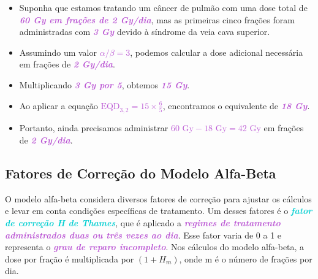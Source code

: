 \documentclass[11pt,a4paper]{article}
\begin{document}
	\begin{tcolorbox}[width=\textwidth, colback={white}, colbacktitle={DarkTurquoise!50!white}, title={$\bigstar$ \LobsterTwo{Exemplo: Cálculo do EQD\textsubscript{2}} $\bigstar$}, coltitle={CarnationPink}, colframe={DarkTurquoise}, fonttitle=\rmfamily\bfseries\Large, breakable]

		\begin{itemize}[label=\textcolor{CarnationPink}{$\blacktriangleright$}]
			\item Suponha que estamos tratando um câncer de pulmão com uma dose total de \textcolor{MediumOrchid}{\textbf{\textit{60 Gy em frações de 2 Gy/dia}}}, mas as primeiras cinco frações foram administradas com \textcolor{MediumOrchid}{\textbf{\textit{3 Gy}}} devido à síndrome da veia cava superior.
			\item Assumindo um valor \textcolor{MediumOrchid}{\textbf{\textit{$\alpha/\beta = 3$}}}, podemos calcular a dose adicional necessária em frações de \textcolor{MediumOrchid}{\textbf{\textit{2 Gy/dia}}}. 
			\item Multiplicando \textcolor{MediumOrchid}{\textbf{\textit{3 Gy por 5}}}, obtemos \textcolor{MediumOrchid}{\textbf{\textit{15 Gy}}}. 
			\item Ao aplicar a equação \textcolor{MediumOrchid}{\textbf{\textit{$\text{EQD}_{3,2} = 15 \times \frac{6}{5}$}}}, encontramos o equivalente de \textcolor{MediumOrchid}{\textbf{\textit{18 Gy}}}.
			\item Portanto, ainda precisamos administrar \textcolor{MediumOrchid}{\textbf{\textit{$60 \text{ Gy} - 18 \text{ Gy} = 42 \text{ Gy}$}}} em frações de \textcolor{MediumOrchid}{\textbf{\textit{2 Gy/dia}}}.
		\end{itemize}
	\end{tcolorbox}

\subsection*{Fatores de Correção do Modelo Alfa-Beta}

	O modelo alfa-beta considera diversos fatores de correção para ajustar os cálculos e levar em conta condições específicas de tratamento. Um desses fatores é o\textcolor{DarkTurquoise}{\textbf{\textit{ fator de correção H de Thames}}}, que é aplicado a \textcolor{MediumOrchid}{\textbf{\textit{regimes de tratamento administrados duas ou três vezes ao dia}}}. Esse fator varia de 0 a 1 e representa o \textcolor{MediumOrchid}{\textbf{\textit{grau de reparo incompleto}}}. Nos cálculos do modelo alfa-beta, a dose por fração é multiplicada por $(1 + H_m)$, onde m é o número de frações por dia. 
	
\end{document}

